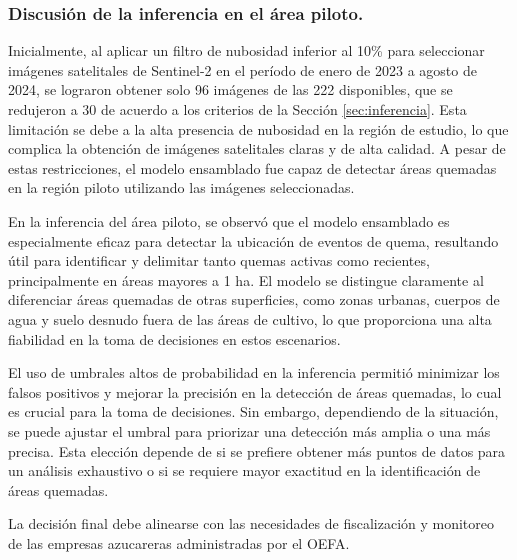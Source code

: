 \subsubsection{Discusión de la inferencia en el área piloto.}
Inicialmente, al aplicar un filtro de nubosidad inferior al 10\% para seleccionar imágenes satelitales de Sentinel-2 en el período de enero de 2023 a agosto de 2024, se lograron obtener solo 
96 imágenes de las 222 disponibles, que se redujeron a 30 de acuerdo a los criterios de la Sección \ref{sec:inferencia}. Esta limitación se debe a la alta presencia de nubosidad en la región de estudio, 
lo que complica la obtención de imágenes satelitales claras y de alta calidad. A pesar de estas restricciones, el modelo ensamblado fue capaz de detectar áreas quemadas en la región piloto 
utilizando las imágenes seleccionadas.

En la inferencia del área piloto, se observó que el modelo ensamblado es especialmente eficaz para detectar la ubicación de eventos de quema, resultando útil para identificar y 
delimitar tanto quemas activas como recientes, principalmente en áreas mayores a 1 ha. El modelo se distingue claramente al diferenciar áreas quemadas de otras superficies, como zonas urbanas,
cuerpos de agua y suelo desnudo fuera de las áreas de cultivo, lo que proporciona una alta fiabilidad en la toma de decisiones en estos escenarios.

El uso de umbrales altos de probabilidad en la inferencia permitió minimizar los falsos positivos y mejorar la precisión en la detección de áreas quemadas, lo cual es crucial para la toma de decisiones. Sin embargo, 
dependiendo de la situación, se puede ajustar el umbral para priorizar una detección más amplia o una más precisa. Esta elección depende de si se prefiere obtener más puntos de datos para un análisis exhaustivo o si 
se requiere mayor exactitud en la identificación de áreas quemadas. 

La decisión final debe alinearse con las necesidades de fiscalización y monitoreo de las empresas azucareras administradas por el OEFA.
